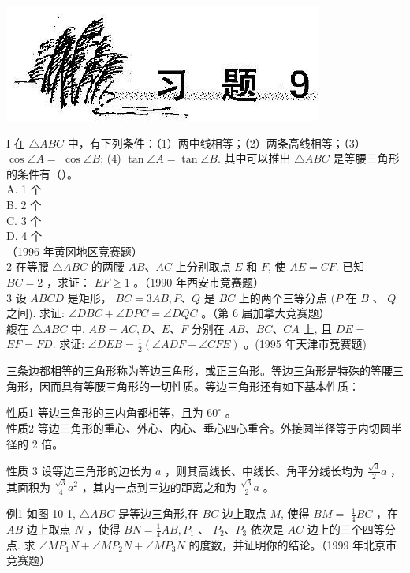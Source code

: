 \documentclass[10pt]{article}
\begin{document}
\begin{center}
\includegraphics[max width=\textwidth]{2024_10_30_2c8f45efd4a519b08e1ag-094}
\end{center}

I 在 $\triangle A B C$ 中，有下列条件：（1）两中线相等；（2）两条高线相等；（3） $\cos \angle A=$ $\cos \angle B$; (4) $\tan \angle A=\tan \angle B$. 其中可以推出 $\triangle A B C$ 是等腰三角形的条件有（）。\\
A. 1 个\\
B. 2 个\\
C. 3 个\\
D. 4 个\\
（1996 年黄冈地区竞赛题）\\
2 在等腰 $\triangle A B C$ 的两腰 $A B 、 A C$ 上分别取点 $E$ 和 $F$, 使 $A E=C F$. 已知 $B C=2$ ，求证： $E F \geqslant 1$ 。（1990 年西安市竞赛题）\\
3 设 $A B C D$ 是矩形， $B C=3 A B, P 、 Q$ 是 $B C$ 上的两个三等分点 $(P$ 在 $B$ 、 $Q$ 之间). 求证: $\angle D B C+\angle D P C=\angle D Q C$ 。（第 6 届加拿大竞赛题）\\
緮在 $\triangle A B C$ 中, $A B=A C, D 、 E 、 F$ 分别在 $A B 、 B C 、 C A$ 上, 且 $D E=$ $E F=F D$. 求证: $\angle D E B=\frac{1}{2}(\angle A D F+\angle C F E)$ 。(1995 年天津市竞赛题)

三条边都相等的三角形称为等边三角形，或正三角形。等边三角形是特殊的等腰三角形，因而具有等腰三角形的一切性质。等边三角形还有如下基本性质：

性质1 等边三角形的三内角都相等，且为 $60^{\circ}$ 。\\
性质2 等边三角形的重心、外心、内心、垂心四心重合。外接圆半径等于内切圆半径的 2 倍。

性质 3 设等边三角形的边长为 $a$ ，则其高线长、中线长、角平分线长均为 $\frac{\sqrt{3}}{2} a$ ，其面积为 $\frac{\sqrt{3}}{4} a^{2}$ ，其内一点到三边的距离之和为 $\frac{\sqrt{3}}{2} a$ 。

例1 如图 10-1, $\triangle A B C$ 是等边三角形,在 $B C$ 边上取点 $M$, 使得 $B M=$ $\frac{1}{4} B C$ ，在 $A B$ 边上取点 $N$ ，使得 $B N=\frac{1}{4} A B, P_{1}$ 、 $P_{2} 、 P_{3}$ 依次是 $A C$ 边上的三个四等分点. 求 $\angle M P_{1} N+\angle M P_{2} N+\angle M P_{3} N$ 的度数，并证明你的结论。（1999 年北京市竞赛题）
\end{document}
